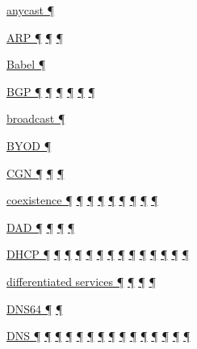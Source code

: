 \documentclass[
]{article}
\begin{document}
\hyperref[addresses]{anycast ¶}

\hyperref[address-resolution]{ARP ¶}
\hyperref[ipv6-primary-differences-from-ipv4]{¶}
\hyperref[layer-2-considerations]{¶}

\hyperref[routing]{Babel ¶}

\hyperref[addresses]{BGP ¶} \hyperref[routing]{¶}
\hyperref[further-reading]{¶} \hyperref[filtering]{¶}
\hyperref[multi-prefix-operation]{¶} \hyperref[multihoming]{¶}

\hyperref[ipv6-primary-differences-from-ipv4]{broadcast ¶}

\hyperref[address-and-prefix-management]{BYOD ¶}

\hyperref[dual-stack-scenarios]{CGN ¶} \hyperref[obsolete-techniques]{¶}
\hyperref[tunnels]{¶}

\hyperref[obsolete-features-in-ipv6]{coexistence ¶}
\hyperref[coexistence-with-legacy-ipv4]{¶}
\hyperref[dual-stack-scenarios]{¶} \hyperref[obsolete-techniques]{¶}
\hyperref[translation-and-ipv4-as-a-service]{¶} \hyperref[tunnels]{¶}
\hyperref[network-design]{¶} \hyperref[energy-consumption]{¶}
\hyperref[multihoming]{¶}

\hyperref[address-resolution]{DAD ¶} \hyperref[auto-configuration]{¶}
\hyperref[layer-2-considerations]{¶}
\hyperref[address-and-prefix-management]{¶}

\hyperref[auto-configuration]{DHCP ¶} \hyperref[dns]{¶}
\hyperref[managed-configuration]{¶} \hyperref[routing]{¶}
\hyperref[source-and-destination-address-selection]{¶}
\hyperref[dual-stack-scenarios]{¶}
\hyperref[ipv6-primary-differences-from-ipv4]{¶} \hyperref[filtering]{¶}
\hyperref[layer-2-considerations]{¶} \hyperref[address-planning]{¶}
\hyperref[prefix-per-host]{¶}
\hyperref[address-and-prefix-management]{¶}
\hyperref[multi-prefix-operation]{¶} \hyperref[cern-and-the-lhc]{¶}

\hyperref[packet-format]{differentiated services ¶}
\hyperref[routing]{¶} \hyperref[traffic-class-and-flow-label]{¶}
\hyperref[transport-protocols]{¶}

\hyperref[dual-stack-scenarios]{DNS64 ¶}
\hyperref[translation-and-ipv4-as-a-service]{¶}

\hyperref[how-an-application-programmer-sees-ipv6]{DNS ¶}
\hyperref[addresses]{¶} \hyperref[auto-configuration]{¶}
\hyperref[dns]{¶} \hyperref[managed-configuration]{¶}
\hyperref[dual-stack-scenarios]{¶}
\hyperref[translation-and-ipv4-as-a-service]{¶}
\hyperref[management-and-operations]{¶}
\hyperref[address-and-prefix-management]{¶}
\hyperref[benchmarking-and-monitoring]{¶}
\hyperref[multi-prefix-operation]{¶} \hyperref[multihoming]{¶}
\hyperref[deployment-in-the-enterprise]{¶}
\hyperref[deployment-in-the-home]{¶} \hyperref[status]{¶}
\end{document}
